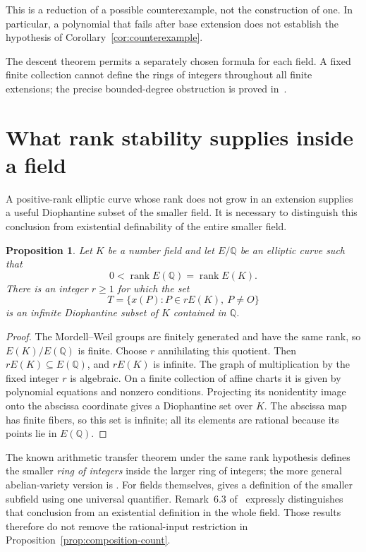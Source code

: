 \documentclass[11pt,a4paper]{article}
\newtheorem{proposition}[theorem]{Proposition}
\theoremstyle{definition}
\newcommand{\Q}{\mathbb Q}
\begin{document}
This is a reduction of a possible counterexample, not the
construction of one. In particular, a polynomial that fails after
base extension does not establish the hypothesis of
Corollary~\ref{cor:counterexample}.

The descent theorem permits a separately chosen formula for each
field. A fixed finite collection cannot define the rings of integers
throughout all finite extensions; the precise bounded-degree
obstruction is proved in~\cite{UnchangedFormulas}.

\section{What rank stability supplies inside a field}

A positive-rank elliptic curve whose rank does not grow in an
extension supplies a useful Diophantine subset of the smaller
field. It is necessary to distinguish this conclusion from
existential definability of the entire smaller field.

\begin{proposition}\label{prop:stable-set}
Let $K$ be a number field and let $E/\Q$ be an elliptic curve
such that
\[
                0<\operatorname{rank}E(\Q)
                         =\operatorname{rank}E(K).
\]
There is an integer $r\ge1$ for which the set
\[
 T=\{x(P):P\in rE(K),\ P\ne O\}
\]
is an infinite Diophantine subset of $K$ contained in $\Q$.
\end{proposition}
\begin{proof}
The Mordell--Weil groups are finitely generated and have the same
rank, so $E(K)/E(\Q)$ is finite. Choose $r$ annihilating this
quotient. Then $rE(K)\subseteq E(\Q)$, and $rE(K)$ is infinite.
The graph of multiplication by the fixed integer $r$ is
algebraic. On a finite collection of affine charts it is given
by polynomial equations and nonzero conditions. Projecting its
nonidentity image onto the abscissa coordinate gives a
Diophantine set over $K$. The abscissa map has finite fibers,
so this set is infinite; all its elements are rational because
its points lie in $E(\Q)$.
\end{proof}

The known arithmetic transfer theorem under the same rank
hypothesis defines the smaller \emph{ring of integers} inside
the larger ring of integers; the more general abelian-variety
version is \cite[Theorem 4.2]{Poonen}. For fields themselves,
\cite[Theorem 4]{CornelissenShlapentokh} gives a definition of
the smaller subfield using one universal quantifier. Remark~6.3 of~\cite{CornelissenShlapentokh} expressly distinguishes
that conclusion from an existential definition in the whole
field. Those results therefore do not remove the rational-input
restriction in Proposition~\ref{prop:composition-count}.
\end{document}
